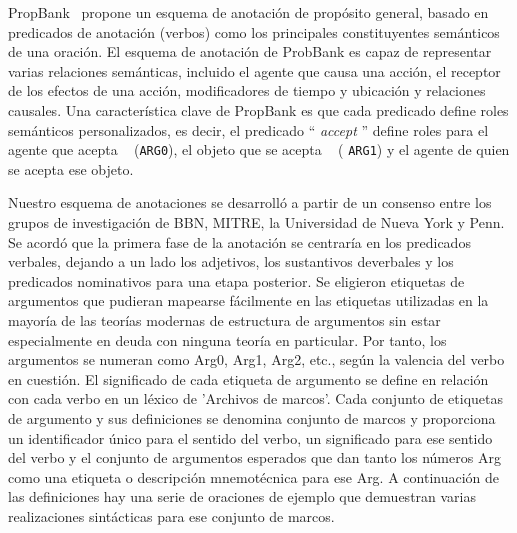 PropBank~\cite{propbank} propone un esquema de anotación de propósito general, basado en predicados de anotación (verbos) como los principales constituyentes semánticos de una oración. El esquema de anotación de ProbBank es capaz de representar varias relaciones semánticas, incluido el agente que causa una acción, el receptor de los efectos de una acción, modificadores de tiempo y ubicación y relaciones causales.
Una característica clave de PropBank es que cada predicado define roles semánticos personalizados, es decir, el predicado `` \textit{accept} '' define roles para el agente que acepta ~ (\texttt{ARG0}), el objeto que se acepta ~ ( \texttt{ARG1}) y el agente de quien se acepta ese objeto.

Nuestro esquema de anotaciones se desarrolló a partir de un consenso entre los grupos de investigación de BBN, MITRE, la Universidad de Nueva York y Penn. Se acordó que la primera fase de la anotación se centraría en los predicados verbales, dejando a un lado los adjetivos, los sustantivos deverbales y los predicados nominativos para una etapa posterior.
Se eligieron etiquetas de argumentos que pudieran mapearse fácilmente en las etiquetas utilizadas en la mayoría de las teorías modernas de estructura de argumentos sin estar especialmente en deuda con ninguna teoría en particular.
Por tanto, los argumentos se numeran como Arg0, Arg1, Arg2, etc., según la valencia del verbo en cuestión. El significado de cada etiqueta de argumento se define en relación con cada verbo en un léxico de 'Archivos de marcos'. Cada conjunto de etiquetas de argumento y sus definiciones se denomina conjunto de marcos y proporciona un identificador único para el sentido del verbo, un significado para ese sentido del verbo y el conjunto de argumentos esperados que dan tanto los números Arg como una etiqueta o descripción mnemotécnica para ese Arg.
A continuación de las definiciones hay una serie de oraciones de ejemplo que demuestran varias realizaciones sintácticas para ese conjunto de marcos.

